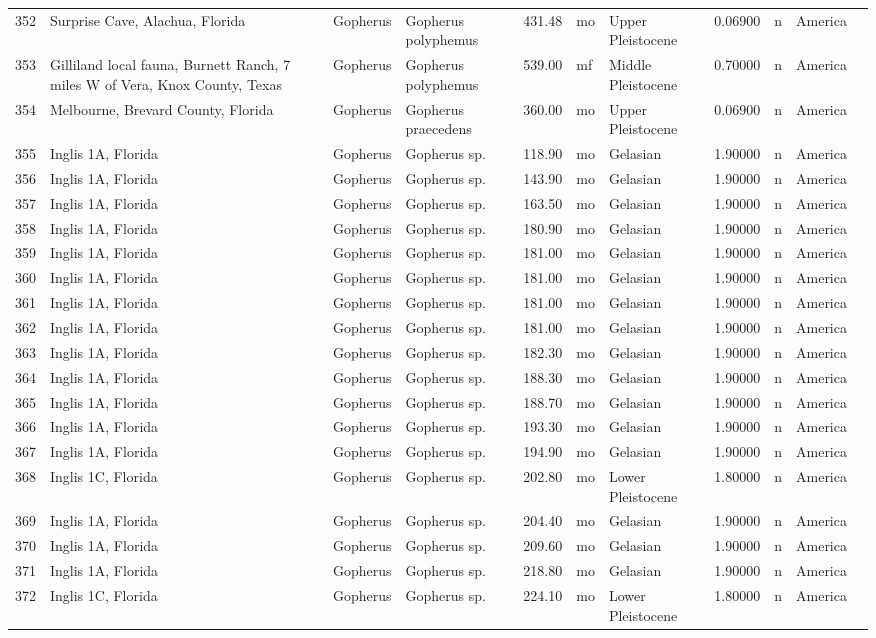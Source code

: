 \begin{landscape}
{\begin{longtable}[]{@{}llllrllrlll@{}}
	352 & Surprise Cave, Alachua, Florida & Gopherus & Gopherus polyphemus &
	431.48 & mo & Upper Pleistocene & 0.06900 & n & America\tabularnewline
	353 & Gilliland local fauna, Burnett Ranch, 7 miles W of Vera, Knox
	County, Texas & Gopherus & Gopherus polyphemus & 539.00 & mf & Middle
	Pleistocene & 0.70000 & n & America\tabularnewline
	354 & Melbourne, Brevard County, Florida & Gopherus & Gopherus
	praecedens & 360.00 & mo & Upper Pleistocene & 0.06900 & n &
	America\tabularnewline
	355 & Inglis 1A, Florida & Gopherus & Gopherus sp. & 118.90 & mo &
	Gelasian & 1.90000 & n & America\tabularnewline
	356 & Inglis 1A, Florida & Gopherus & Gopherus sp. & 143.90 & mo &
	Gelasian & 1.90000 & n & America\tabularnewline
	357 & Inglis 1A, Florida & Gopherus & Gopherus sp. & 163.50 & mo &
	Gelasian & 1.90000 & n & America\tabularnewline
	358 & Inglis 1A, Florida & Gopherus & Gopherus sp. & 180.90 & mo &
	Gelasian & 1.90000 & n & America\tabularnewline
	359 & Inglis 1A, Florida & Gopherus & Gopherus sp. & 181.00 & mo &
	Gelasian & 1.90000 & n & America\tabularnewline
	360 & Inglis 1A, Florida & Gopherus & Gopherus sp. & 181.00 & mo &
	Gelasian & 1.90000 & n & America\tabularnewline
	361 & Inglis 1A, Florida & Gopherus & Gopherus sp. & 181.00 & mo &
	Gelasian & 1.90000 & n & America\tabularnewline
	362 & Inglis 1A, Florida & Gopherus & Gopherus sp. & 181.00 & mo &
	Gelasian & 1.90000 & n & America\tabularnewline
	363 & Inglis 1A, Florida & Gopherus & Gopherus sp. & 182.30 & mo &
	Gelasian & 1.90000 & n & America\tabularnewline
	364 & Inglis 1A, Florida & Gopherus & Gopherus sp. & 188.30 & mo &
	Gelasian & 1.90000 & n & America\tabularnewline
	365 & Inglis 1A, Florida & Gopherus & Gopherus sp. & 188.70 & mo &
	Gelasian & 1.90000 & n & America\tabularnewline
	366 & Inglis 1A, Florida & Gopherus & Gopherus sp. & 193.30 & mo &
	Gelasian & 1.90000 & n & America\tabularnewline
	367 & Inglis 1A, Florida & Gopherus & Gopherus sp. & 194.90 & mo &
	Gelasian & 1.90000 & n & America\tabularnewline
	368 & Inglis 1C, Florida & Gopherus & Gopherus sp. & 202.80 & mo & Lower
	Pleistocene & 1.80000 & n & America\tabularnewline
	369 & Inglis 1A, Florida & Gopherus & Gopherus sp. & 204.40 & mo &
	Gelasian & 1.90000 & n & America\tabularnewline
	370 & Inglis 1A, Florida & Gopherus & Gopherus sp. & 209.60 & mo &
	Gelasian & 1.90000 & n & America\tabularnewline
	371 & Inglis 1A, Florida & Gopherus & Gopherus sp. & 218.80 & mo &
	Gelasian & 1.90000 & n & America\tabularnewline
	372 & Inglis 1C, Florida & Gopherus & Gopherus sp. & 224.10 & mo & Lower
	Pleistocene & 1.80000 & n & America\tabularnewline

\end{longtable}}
\end{landscape}
